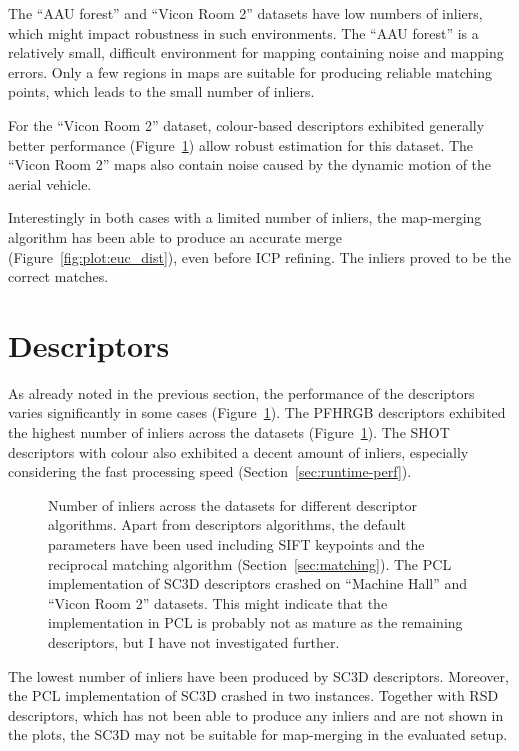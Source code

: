 The ``AAU forest'' and ``Vicon Room 2'' datasets have low numbers of inliers, which might impact robustness in such environments. The ``AAU forest'' is a relatively small, difficult environment for mapping containing noise and mapping errors. Only a few regions in maps are suitable for producing reliable matching points, which leads to the small number of inliers.

For the ``Vicon Room 2'' dataset, colour-based descriptors exhibited generally better performance (Figure~\ref{fig:plot:desc_inliers}) allow robust estimation for this dataset. The ``Vicon Room 2'' maps also contain noise caused by the dynamic motion of the aerial vehicle.

Interestingly in both cases with a limited number of inliers, the map-merging algorithm has been able to produce an accurate merge (Figure~\ref{fig:plot:euc_dist}), even before \gls{ICP} refining. The inliers proved to be the correct matches.

\section{Descriptors}

As already noted in the previous section, the performance of the descriptors varies significantly in some cases (Figure~\ref{fig:plot:desc_inliers}). The \gls{PFHRGB} descriptors exhibited the highest number of inliers across the datasets (Figure~\ref{fig:plot:desc_inliers}). The \gls{SHOT} descriptors with colour also exhibited a decent amount of inliers, especially considering the fast processing speed (Section~\ref{sec:runtime-perf}).

\begin{figure}
  \centering
  
  \caption[Number of inliers per descriptors]{Number of inliers across the datasets for different descriptor algorithms. Apart from descriptors algorithms, the default parameters have been used including \gls{SIFT} keypoints and the reciprocal matching algorithm (Section~\ref{sec:matching}). The \gls{PCL} implementation of \gls{SC3D} descriptors crashed on ``Machine Hall'' and ``Vicon Room 2'' datasets. This might indicate that the implementation in \gls{PCL} is probably not as mature as the remaining descriptors, but I have not investigated further.}
  \label{fig:plot:desc_inliers}
\end{figure}

The lowest number of inliers have been produced by \gls{SC3D} descriptors. Moreover, the \gls{PCL} implementation of \gls{SC3D} crashed in two instances. Together with \gls{RSD} descriptors, which has not been able to produce any inliers and are not shown in the plots, the \gls{SC3D} may not be suitable for map-merging in the evaluated setup.


